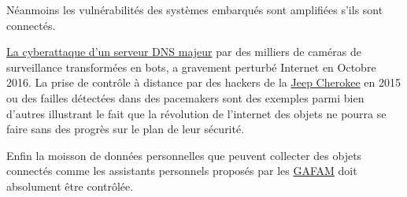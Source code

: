 Néanmoins les vulnérabilités des systèmes embarqués sont amplifiées s'ils sont connectés.

\href{https://fr.wikipedia.org/wiki/Cyberattaque_de_2016_contre_Dyn}{La cyberattaque d'un  serveur DNS majeur} par des milliers de caméras de surveillance transformées en bots, a gravement perturbé Internet en Octobre 2016. La prise de contrôle à distance par des hackers de la \href{https://www.wired.com/2015/07/hackers-remotely-kill-jeep-highway/}{Jeep Cherokee} en 2015 ou des failles détectées dans des pacemakers sont des exemples parmi bien d'autres illustrant le fait que la révolution  de l'internet des objets ne pourra se faire sans des progrès sur le plan de leur sécurité.

Enfin  la moisson de données personnelles que  peuvent collecter des objets connectés comme les assistants personnels proposés par les \href{https://fr.wikipedia.org/wiki/GAFAM}{GAFAM}  doit absolument être contrôlée.


